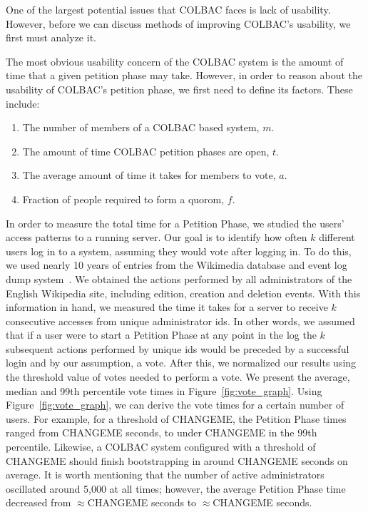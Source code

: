 One of the largest potential issues that COLBAC faces is lack of usability.
However, before we can discuss methods of improving COLBAC's usability, we first
must analyze it. 

The most obvious usability concern of the COLBAC system is the amount of time
that a given petition phase may take. However, in order to reason about the
usability of COLBAC's petition phase, we first need to define its factors. These
include:
\begin{enumerate}
\item The number of members of a COLBAC based system, $m$.
\item The amount of time COLBAC petition phases are open, $t$.
\item The average amount of time it takes for members to vote, $a$.
\item Fraction of people required to form a quorom, $f$.
\end{enumerate}


In order to measure the total time for a Petition Phase, we studied the
users’ access patterns to a running server. Our goal is to identify how often
$k$ different users log in to a system, assuming they would vote after logging
in. To do this, we used nearly 10 years of entries from the Wikimedia database
and event log dump system~\cite{wikidata}. We obtained the actions performed by
all administrators of the English Wikipedia site, including edition, creation
and deletion events. With this information in hand, we measured the time it
takes for a server to receive $k$ consecutive accesses from unique administrator
ids. In other words, we assumed that if a user were to start a Petition Phase at
any point in the log the $k$ subsequent actions performed by unique ids would be
preceded by a successful login and by our assumption, a vote. After this, we
normalized our results using the threshold value of votes needed to perform a
vote. We present the average, median and 99th percentile vote times in
Figure~\ref{fig:vote_graph}. Using Figure~\ref{fig:vote_graph}, we can derive
the vote times for a certain number of users. For example, for a threshold of
CHANGEME, the Petition Phase times ranged from CHANGEME seconds, to under
CHANGEME in the 99th percentile. Likewise, a COLBAC system configured with a
threshold of CHANGEME should finish bootstrapping in around CHANGEME seconds on
average. It is worth mentioning that the number of active administrators
oscillated around 5,000 at all times; however, the average Petition Phase time
decreased from $\approx$CHANGEME seconds to $\approx$CHANGEME seconds. 

